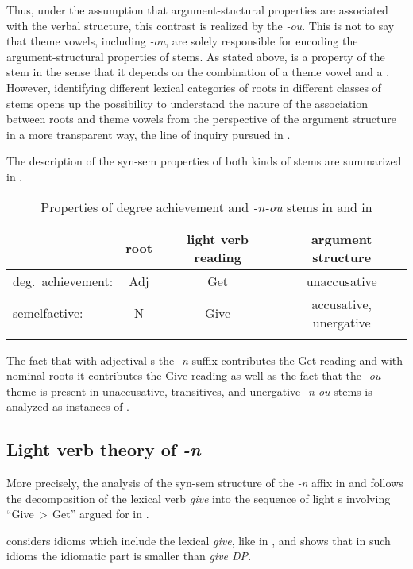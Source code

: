  Thus, under the assumption that argument-stuctural properties are associated with the verbal structure, this contrast is realized by the  \textit{-ou}. This is not to say that theme vowels, including \textit{-ou}, are solely responsible for encoding the argument-structural properties of  stems. As stated above,  is a property of the stem in the sense that it depends on the combination of a theme vowel and a . However, identifying different lexical categories of roots in different classes of stems opens up the possibility to understand the nature of the association between roots and theme vowels from the perspective of the argument structure in a more transparent way, the line of inquiry pursued in \cite{Jablonska2007}.
\par The description of the syn-sem properties of both kinds of stems are summarized in  .

\begin{table}
\caption{Properties of degree achievement and   \textit{-n-ou} stems in  and  in \cite{NU}}
\label{tab:summary}
\begin{tabular}{ l  c  c  c }
\lsptoprule		
				& root	& light verb reading	& argument structure\\\midrule
deg.\ achievement: 	& Adj	& Get  				& unaccusative\\
 semelfactive: 		& N   	& Give 				& accusative, unergative\\
\lspbottomrule
\end{tabular}
\end{table}

\noindent The fact that with adjectival s the \textit{-n} suffix contributes the Get-reading  and with nominal roots it contributes the Give-reading  as well as the fact that the \textit{-ou} theme is present in unaccusative, transitives, and unergative \textit{-n-ou} stems is analyzed as instances of .

\subsection{Light verb theory of \textit{-n}}

More precisely, the analysis  of the syn-sem structure of the \textit{-n} affix in  and  follows the decomposition of the  lexical verb \textit{give} into the sequence of light s involving ``Give\,$>$\,Get'' argued for in \cite{Richards2001}.
\par
\cite{Richards2001} considers  idioms which include the lexical \textit{give}, like in \Next, and shows that in such idioms the idiomatic part is smaller than \textit{give DP}.

